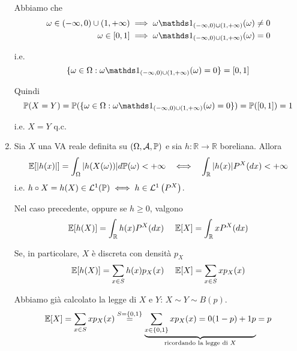 \begin{enumerate}
Abbiamo che
\begin{align*}
\omega \in ( -\infty ,0) \cup ( 1,+\infty ) & \implies \omega \Ind_{( -\infty ,0) \cup ( 1,+\infty )}( \omega ) \neq 0\\
\omega \in [ 0,1] & \implies \omega \Ind_{( -\infty ,0) \cup ( 1,+\infty )}( \omega ) =0
\end{align*}

i.e.\begin{equation*}
\{\omega \in \Omega :\omega \Ind_{( -\infty ,0) \cup ( 1,+\infty )}( \omega ) =0\} =[ 0,1]
\end{equation*}

Quindi
\begin{equation*}
\PP( X=Y) =\PP(\{\omega \in \Omega :\omega \Ind_{( -\infty ,0) \cup ( 1,+\infty )}( \omega ) =0\}) =\PP([ 0,1]) =1
\end{equation*}

i.e. $X=Y$ q.c.
\item \begin{theorem}
Sia $X$ una VA reale definita su $( \Omega ,\mathcal{A} ,\mathbb{P})$ e sia $h:\mathbb{R}\rightarrow \mathbb{R}$ boreliana. Allora
\begin{equation*}
\EE[| h( x)| ] =\int _{\Omega }| h( X( \omega ))| d\PP( \omega ) < +\infty \ \ \iff \ \ \int _{\mathbb{R}}| h( x)| P^{X}( dx) < +\infty 
\end{equation*}
i.e. $h\circ X=h( X) \in \mathcal{L}^{1}(\mathbb{P}) \iff h\in \mathcal{L}^{1}\left( P^{X}\right)$.

Nel caso precedente, oppure se $h\geq 0$, valgono
\begin{equation*}
\mathbb{E}[ h( X)] =\int _{\mathbb{R}} h( x) P^{X}( dx) \ \ \ \ \mathbb{E}[ X] =\int _{\mathbb{R}} xP^{X}( dx)
\end{equation*}

Se, in particolare, $X$ è discreta con densità $p_{X}$\begin{equation*}
\mathbb{E}[ h( X)] =\sum\limits _{x\in S} h( x) p_{X}( x) \ \ \ \ \mathbb{E}[ X] =\sum\limits _{x\in S} xp_{X}( x)
\end{equation*}
\end{theorem}

Abbiamo già calcolato la legge di $X$ e $Y$: $X\sim Y\sim B( p)$.\begin{equation*}
\mathbb{E}[ X] =\sum\limits _{x\in S} xp_{X}( x)\overset{S=\{0,1\}}{=}\underbrace{\sum\limits _{x\in \{0,1\}} xp_{X}( x) =0( 1-p) +1p}_{\text{ricordando la legge di } X} =p
\end{equation*}


\end{enumerate}
